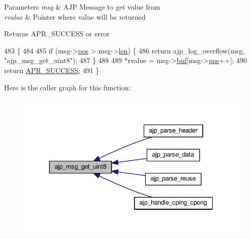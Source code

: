 \begin{DoxyParams}{Parameters}
{\em msg} & A\+JP Message to get value from \\
\hline
{\em rvalue} & Pointer where value will be returned \\
\hline
\end{DoxyParams}
\begin{DoxyReturn}{Returns}
A\+P\+R\+\_\+\+S\+U\+C\+C\+E\+SS or error 
\end{DoxyReturn}

\begin{DoxyCode}
483 \{
484 
485     \textcolor{keywordflow}{if} (msg->\hyperlink{structajp__msg_af2b6552360c32f52f84383d538d3df00}{pos} > msg->\hyperlink{structajp__msg_ab31fbddb808b5f3c0549cdb0f39639cf}{len}) \{
486         \textcolor{keywordflow}{return} ajp\_log\_overflow(msg, \textcolor{stringliteral}{"ajp\_msg\_get\_uint8"});
487     \}
488 
489     *rvalue = msg->\hyperlink{structajp__msg_a7343b1803e9177dccb3c4716a5e12c3a}{buf}[msg->\hyperlink{structajp__msg_af2b6552360c32f52f84383d538d3df00}{pos}++];
490     \textcolor{keywordflow}{return} \hyperlink{group__apr__errno_ga9ee311b7bf1c691dc521d721339ee2a6}{APR\_SUCCESS};
491 \}
\end{DoxyCode}


Here is the caller graph for this function\+:
\nopagebreak
\begin{figure}[H]
\begin{center}
\leavevmode
\includegraphics[width=337pt]{group__AJP__api_gaa3925c80a11ba8dab237dc86705597af_icgraph}
\end{center}
\end{figure}



